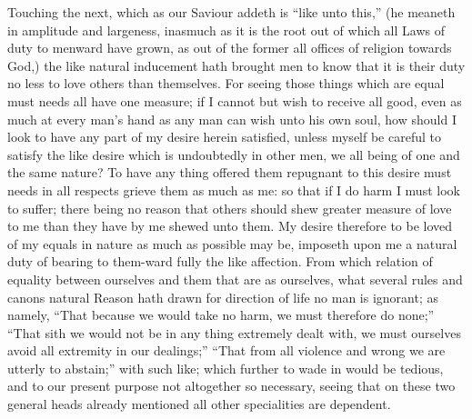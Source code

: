 Touching the next, which as our Saviour addeth is “like unto this,” (he meaneth in amplitude and largeness, inasmuch as it is the root out of which all Laws of duty to menward have grown, as out of the former all offices of religion towards God,) the like natural inducement hath brought men to know that it is their duty no less to love others than themselves. For seeing those things which are equal must needs all have one measure; if I cannot but wish to receive all good, even as much at every man’s hand as any man can wish unto his own soul, how should I look to have any part of my desire herein satisfied, unless myself be careful to satisfy the like desire which is undoubtedly in other men, we all being of one and the same nature? To have any thing offered them repugnant to this desire must needs in all respects grieve them as much as me: so that if I do harm I must look to suffer; there being no reason that others should shew greater measure of love to me than they have by me shewed unto them. My desire therefore to be loved of my equals in nature as much as possible may be, imposeth upon me a natural duty of bearing to them-ward fully the like affection. From which relation of equality between ourselves and them that are as ourselves, what several rules and canons natural Reason hath drawn for direction of life no man is ignorant; as namely, “That because we would take no harm, we must  therefore do none;” “That sith we would not be in any thing extremely dealt with, we must ourselves avoid all extremity in our dealings;” “That from all violence and wrong we are utterly to abstain;” with such like; which further to wade in would be tedious, and to our present purpose not altogether so necessary, seeing that on these two general heads already mentioned all other specialities are dependent.

